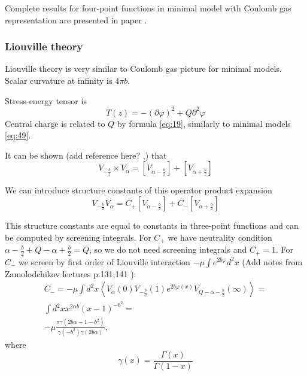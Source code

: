 \documentclass[12pt]{article}
\begin{document}
Complete results for four-point functions in minimal model with Coulomb gas representation are
presented in paper \cite{dotsenko1985four}. 

\subsubsection{Liouville theory}
\label{sec:liouville-theory-1}

Liouville theory is very similar to Coulomb gas picture for minimal models. Scalar curvature at
infinity is $4\pi b$. 

Stress-energy tensor is
\begin{equation}
  \label{eq:68}
  T(z)=-(\partial \varphi)^{2}+Q \partial^{2}\varphi
\end{equation}
Central charge is related to $Q$ by formula \eqref{eq:19}, similarly to minimal models
\eqref{eq:49}. 

It can be shown (add reference here? \cite{nakayama2004liouville},\cite{teschner2001liouville}) that 
\begin{equation}
  \label{eq:34}
  V_{-\frac{b}{2}}\times V_{\alpha}= [V_{\alpha-\frac{b}{2}}]+[V_{\alpha+\frac{b}{2}}]
\end{equation}

We can introduce structure constants of this operator product expansion \cite{fateev2000boundary}
\begin{equation}
  \label{eq:35}
   V_{-\frac{b}{2}} V_{\alpha}= C_{+}[V_{\alpha-\frac{b}{2}}]+C_{-}[V_{\alpha+\frac{b}{2}}]
\end{equation}

This structure constants are equal to constants in three-point functions and can be computed by
screening integrals. For $C_{+}$ we have neutrality condition
$\alpha-\frac{b}{2}+Q-\alpha+\frac{b}{2}=Q$, so we do not need screening integrals and $C_{+}=1$.
For $C_{-}$ we screen by first order of Liouville interaction $-\mu\int e^{2b\varphi} d^{2}x$ 
(Add notes from Zamolodchikov lectures p.131,141 \cite{zamolodchikovlectures}): 
\begin{multline}
  \label{eq:36}
  C_{-}=-\mu\int d^{2}x \left<V_{\alpha}(0)V_{-\frac{b}{2}}(1) e^{2b\varphi(x)}
    V_{Q-\alpha-\frac{b}{2}}(\infty)\right>=\\
  \int d^{2}x x^{2\alpha b} (x-1)^{-b^{2}}=\\
  -\mu\frac{\pi\gamma(2b\alpha-1-b^{2})}{\gamma(-b^{2})\gamma(2b\alpha)},
\end{multline}
where
\begin{equation}
  \label{eq:37}
  \gamma(x)=\frac{\Gamma(x)}{\Gamma(1-x)}
\end{equation}
\end{document}
